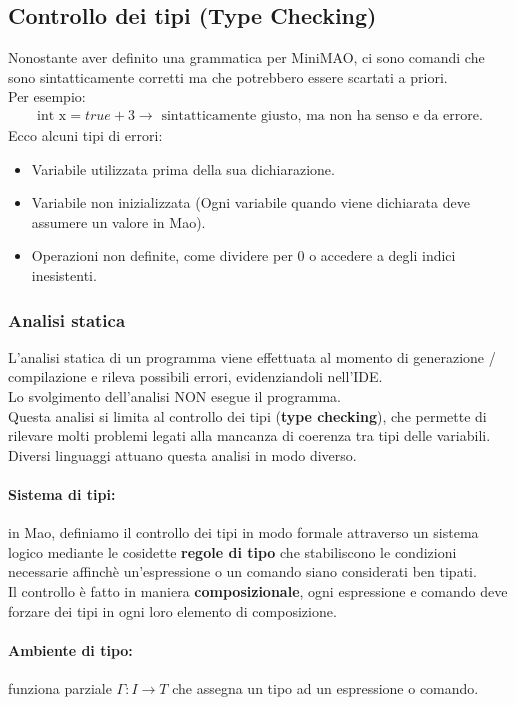 \documentclass[a4paper,12pt]{article}
\begin{document}
\subsection{Controllo dei tipi (Type Checking)}
Nonostante aver definito una grammatica per MiniMAO, ci sono comandi che sono sintatticamente corretti ma che potrebbero essere scartati a priori.\\
Per esempio:
\begin{align*}
  \text{int x} = true + 3 \rightarrow \text{ sintatticamente giusto, ma non ha senso e da errore.}
\end{align*}
Ecco alcuni tipi di errori:
\begin{itemize}
  \item Variabile utilizzata prima della sua dichiarazione.
  \item Variabile non inizializzata (Ogni variabile quando viene dichiarata deve assumere un valore in Mao).
  \item Operazioni non definite, come dividere per 0 o accedere a degli indici inesistenti.
\end{itemize}
\subsubsection{Analisi statica}
L'analisi statica di un programma viene effettuata al momento di generazione / compilazione e rileva possibili errori, evidenziandoli nell'IDE.\\
Lo svolgimento dell'analisi NON esegue il programma.\\
Questa analisi si limita al controllo dei tipi (\textbf{type checking}), che permette di rilevare molti problemi legati alla mancanza di coerenza tra tipi delle variabili.\\
Diversi linguaggi attuano questa analisi in modo diverso.

\paragraph{Sistema di tipi: } in Mao, definiamo il controllo dei tipi in modo formale attraverso un sistema logico mediante le cosidette
\textbf{regole di tipo} che stabiliscono le condizioni necessarie affinchè un'espressione o un comando siano considerati ben tipati.\\
Il controllo è fatto in maniera \textbf{composizionale}, ogni espressione e comando deve forzare dei tipi in ogni loro elemento di composizione.

\paragraph{Ambiente di tipo: } funziona parziale $\Gamma: I \rightarrow T$ che assegna un tipo ad un espressione o comando.
\end{document}
